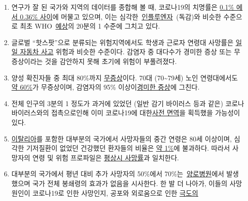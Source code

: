 \begin{enumerate}
\def\labelenumi{\arabic{enumi}.}
\tightlist
\item
  연구가 잘 된 국가와 지역의 데이터를 종합해 볼 때, 코로나19의 치명률은
  \href{https://swprs.org/studies-on-covid-19-lethality/}{0.1\% 에서
  0.36\% 사이}에 머물고 있으며, 이는
  심각한~\href{https://www.ebm-netzwerk.de/en/publications/covid-19}{인플루엔자}~(독감)와
  비슷한 수준으로 최초
  WHO~\href{https://www.businessinsider.com/coronavirus-death-rate-by-age-countries-2020-3}{예상}의
  20분의 1 수준에 그치고 있다.
\item
  글로벌 ``핫스팟''으로 분류되는 위험지역에서도 학생과 근로자 연령대
  사망률은
  \href{https://www.medrxiv.org/content/10.1101/2020.04.05.20054361v1}{일일
  자동차 사고} 위험과 비슷한 수준이다. 감염자 중 대다수가 경미한 증상
  또는 무증상이라는 것을 감안하지 못해 초기에 위험이 부풀려졌다. 
\item
  양성 확진자들 중 최대 80\%까지
  \href{https://www.bmj.com/content/369/bmj.m1375}{무증상}이다. 70대
  (70\textasciitilde{}79세) 노인 연령대에서도
  \href{https://www.niid.go.jp/niid/en/2019-ncov-e/9407-covid-dp-fe-01.html}{약
  60\%}가 무증상이며, 감염자의 95\%
  이상이\href{https://swprs.org/studies-on-covid-19-lethality/\#hospitalizations}{경미한
  증상}에 그친다.
\item
  전체 인구의 3분의 1 정도가 과거에 있었던 (일반 감기 바이러스 등과
  같은) 코로나바이러스와의 접촉으로인해 이미 코로나19에
  대한\href{https://www.medrxiv.org/content/10.1101/2020.04.17.20061440v1}{사전
  면역}을 획득했을 가능성이 있다.
\item
  \href{https://www.epicentro.iss.it/coronavirus/sars-cov-2-decessi-italia}{이탈리아}를
  포함한 대부분의 국가에서 사망자들의 중간 연령은 80세 이상이며, 심각한
  기저질환이 없었던 건강했던 환자들의 비율은
  \href{https://www.bloomberg.com/news/articles/2020-03-18/99-of-those-who-died-from-virus-had-other-illness-italy-says}{약
  1\%}에 불과하다. 따라서 사망자의 연령 및 위험 프로파일은
  \href{https://www.vienna.at/analyse-zeigt-covid-19-opferkurve-entspricht-normaler-mortalitaet/6581246}{평상시
  사망률}과 일치한다.
\item
  대부분의 국가에서 평년 대비 추가 사망자의 50\%에서
  70\%는~\href{https://ltccovid.org/2020/04/12/mortality-associated-with-covid-19-outbreaks-in-care-homes-early-international-evidence/}{양로병원}에서
  발생했으며 국가 전체 봉쇄령의 효과가 없음을 시사한다. 한 발 더 나아가,
  이들의 사망원인이 코로나19로 인한 사망인지, 공포와 외로움으로 인한
  \href{https://www.nytimes.com/2020/04/16/world/canada/montreal-nursing-homes-coronavirus.html}{극도의
}
\end{enumerate}
